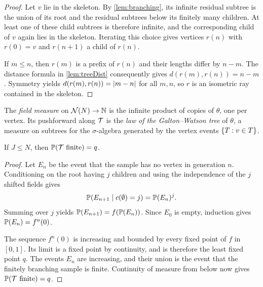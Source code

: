 \begin{proof}
\leanok
Let $v$ lie in the skeleton. By \cref{lem:branching}, its infinite residual subtree is the
union of its root and the residual subtrees below its finitely many children. At least one
of these child subtrees is therefore infinite, and the corresponding child of $v$ again
lies in the skeleton. Iterating this choice gives vertices $r(n)$ with $r(0)=v$ and
$r(n+1)$ a child of $r(n)$.

If $m\leq n$, then $r(m)$ is a prefix of $r(n)$ and their lengths differ by $n-m$.
The distance formula in \cref{lem:treeDist} consequently gives
$d(r(m),r(n))=n-m$. Symmetry yields $d(r(m),r(n))=\lvert m-n \rvert$ for all $m,n$, so $r$ is an
isometric ray contained in the skeleton.
\end{proof}

\begin{definition}
\label{def:sampleMeasure}
\leanok
The \emph{field measure} on $\mathcal{N}(N)\to\mathbb{N}$ is the infinite product of copies of $\theta$, one
per vertex. Its pushforward along $\mathcal{T}$ is the \emph{law of the Galton--Watson tree} of
$\theta$, a measure on subtrees for the $\sigma$-algebra generated by the vertex events
$\{T : v\in T\}$.
\end{definition}

\begin{theorem}
\label{thm:extinction}
\leanok
If $J\leq N$, then $\mathbb{P}(\mathcal{T} \text{ finite})=q$.
\end{theorem}

\begin{proof}
\leanok
Let $E_n$ be the event that the sample has no vertex in generation $n$. Conditioning on
the root having $j$ children and using the independence of the $j$ shifted fields gives
\[
  \mathbb{P}(E_{n+1}\mid c(\emptyset)=j)=\mathbb{P}(E_n)^j.
\]
Summing over $j$ yields $\mathbb{P}(E_{n+1})=f(\mathbb{P}(E_n))$. Since $E_0$ is empty, induction
gives $\mathbb{P}(E_n)=f^n(0)$.

The sequence $f^n(0)$ is increasing and bounded by every fixed point of $f$ in $[0,1]$.
Its limit is a fixed point by continuity, and is therefore the least fixed point $q$.
The events $E_n$ are increasing, and their union is the event that the finitely branching
sample is finite. Continuity of measure from below now gives
$\mathbb{P}(\mathcal{T}\text{ finite})=q$.
\end{proof}
